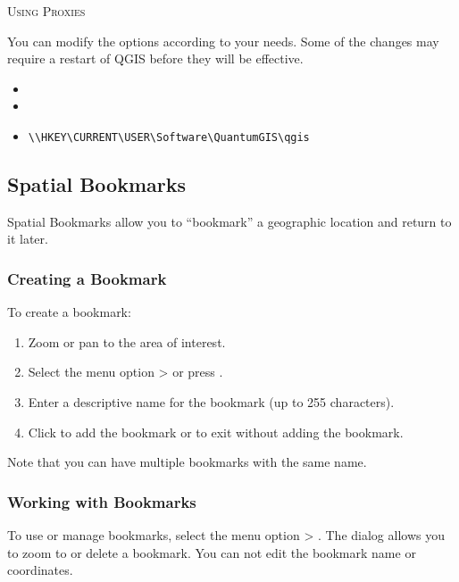 \begin{Tip} \caption{\textsc{Using Proxies}}
\end{Tip}

You can modify the options according to your needs. Some of the changes may 
require a restart of QGIS before they will be effective.

\begin{itemize}
\item {}
\item {}
\item {}
\begin{verbatim}
\\HKEY\CURRENT\USER\Software\QuantumGIS\qgis
\end{verbatim}
\end{itemize}


\subsection{Spatial Bookmarks}\label{sec:bookmarks}

Spatial Bookmarks allow you to ``bookmark'' a geographic location and return to it later.

\subsubsection{Creating a Bookmark}
To create a bookmark:
\begin{enumerate}
\item Zoom or pan to the area of interest.
\item Select the menu option  >  or press .
\item Enter a descriptive name for the bookmark (up to 255 characters).
\item Click  to add the bookmark or  to exit without adding the bookmark.
\end{enumerate}

Note that you can have multiple bookmarks with the same name.

\subsubsection{Working with Bookmarks}
To use or manage bookmarks, select the menu 
option  > .
The  dialog allows you to zoom to or delete a bookmark.
You can not edit the bookmark name or coordinates.

